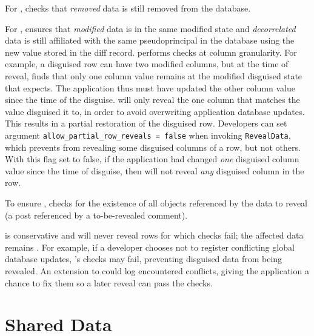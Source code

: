For \one{}, \sys checks that \emph{removed} \xxed data is still removed from the
database.
%

%
For \two{}, \sys ensures that \emph{modified} \xxed data is in the same modified
state and \emph{decorrelated} \xxed data is still affiliated with the same
pseudoprincipal in the database using the new value stored in the diff record.
%
\sys performs checks at column granularity. For example, a disguised
row can have two modified columns, but at the time of reveal, \sys finds that
only one column value remains at the modified disguised state that \sys expects.
The application thus must have updated the other column value since the time of
the disguise. \sys will only reveal the one column that matches the value \sys
disguised it to, in order to avoid overwriting application database updates.
This results in a partial restoration of the disguised row. Developers can set
argument \texttt{allow\_partial\_row\_reveals = false} when invoking
\texttt{RevealData}, which prevents \sys from revealing some disguised columns
of a row, but not others. With this flag set to false, if the application had
changed \emph{one} disguised column value since the time of disguise, then \sys
will not reveal \emph{any} disguised column in the row.
%

%
To ensure \three{}, \sys checks for the existence of all objects referenced by
the data to reveal (\eg a post referenced by a to-be-revealed comment).

\sys is conservative and will never reveal rows for which checks fail; the
affected data remains \xxed.  For example, if a developer chooses not to
register conflicting global database updates, \sys's checks may fail, preventing
disguised data from being revealed.
%
An extension to \sys could log encountered conflicts, giving the application a
chance to fix them so a later reveal can pass the checks.


\section{Shared Data}
\label{s:design:shared}

